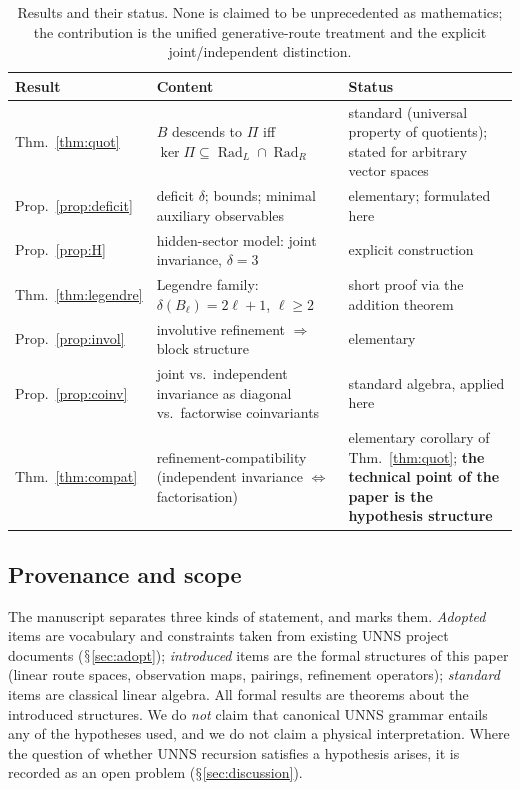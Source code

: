 \documentclass[11pt,a4paper]{article}
\renewcommand{\S}{\ensuremath{\mathsection}}
\newcommand{\Rad}{\operatorname{Rad}}
\newcommand{\defic}{\delta}
\theoremstyle{plain}
\theoremstyle{definition}
\begin{document}
\begin{table}[t]
\centering\small
\begin{tabularx}{\textwidth}{@{}l>{\raggedright\arraybackslash}X>{\raggedright\arraybackslash}p{}@{}}
\toprule
Result & Content & Status\\
\midrule
Thm.~\ref{thm:quot} & $B$ descends to $\Pi$ iff $\ker\Pi\subseteq\Rad_L\cap\Rad_R$ & standard (universal property of quotients); stated for arbitrary vector spaces\\
Prop.~\ref{prop:deficit} & deficit $\defic$; bounds; minimal auxiliary observables & elementary; formulated here\\
Prop.~\ref{prop:H} & hidden-sector model: joint invariance, $\defic=3$ & explicit construction\\
Thm.~\ref{thm:legendre} & Legendre family: $\defic(B_\ell)=2\ell+1$, $\ell\ge2$ & short proof via the addition theorem\\
Prop.~\ref{prop:invol} & involutive refinement $\Rightarrow$ block structure & elementary\\
Prop.~\ref{prop:coinv} & joint vs.\ independent invariance as diagonal vs.\ factorwise coinvariants & standard algebra, applied here\\
Thm.~\ref{thm:compat} & refinement-compatibility (independent invariance $\Leftrightarrow$ factorisation) & elementary corollary of Thm.~\ref{thm:quot}; \textbf{the technical point of the paper is the hypothesis structure}\\
\bottomrule
\end{tabularx}
\caption{Results and their status. None is claimed to be unprecedented as mathematics; the contribution is the unified generative-route treatment and the explicit joint/independent distinction.}\label{tab:results}
\end{table}

\subsection{Provenance and scope}
The manuscript separates three kinds of statement, and marks them.
\emph{Adopted} items are vocabulary and constraints taken from existing UNNS project documents (\S\ref{sec:adopt}); \emph{introduced} items are the formal structures of this paper (linear route spaces, observation maps, pairings, refinement operators); \emph{standard} items are classical linear algebra.
All formal results are theorems about the introduced structures.
We do \emph{not} claim that canonical UNNS grammar entails any of the hypotheses used, and we do not claim a physical interpretation.
Where the question of whether UNNS recursion satisfies a hypothesis arises, it is recorded as an open problem (\S\ref{sec:discussion}).
\end{document}
